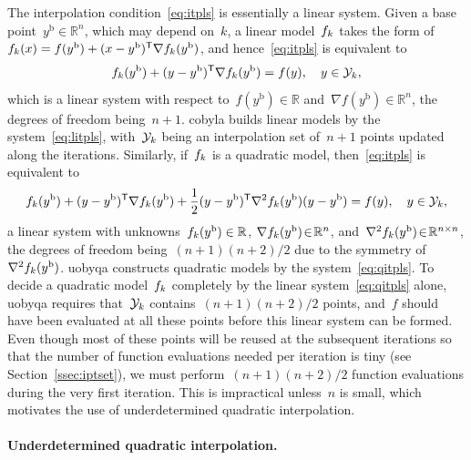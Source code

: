 \documentclass[
    smallextended,  %
    final,        %
]{svjour3}
\newcommand{\R}{\mathbb{R}}
\newcommand{\T}{\mathsf{T}}
\newcommand{\base}{{\text{b}}}
\newcommand{\objm}[1][k]{\obj\ifthenelse{\equal{#1}{}}{}{_{#1}}}
\newcommand{\obj}{f}
\newcommand{\xpt}[1][k]{\mathcal{Y}\ifthenelse{\equal{#1}{}}{}{_{#1}}}
\begin{document}
The interpolation condition~\eqref{eq:itpls} is essentially a linear system.
Given a base point~$y^{\base}\in \R^n$, which may depend on~$k$, a linear model~$\objm$ takes the
form of~$\objm(x) = \obj(y^{\base}) + (x - y^{\base})^{\T} \nabla \objm(y^{\base})$, and
hence~\eqref{eq:itpls} is equivalent to
\begin{equation}
    \label{eq:litpls}
    \objm(y^{\base}) + (y -y^{\base})^{\T} \nabla \objm(y^{\base})  = \obj(y),  \quad y \in \xpt,
\end{equation}
which is a linear system with respect to~$\obj(y^\base) \in \R$ and~$\nabla \obj(y^\base) \in \R^n$, the degrees of freedom being~$n+1$.
\Gls{cobyla} builds linear models by the system~\eqref{eq:litpls}, with~$\xpt$ being an interpolation
set of~$n+1$ points updated along the iterations.
Similarly, if~$\objm$ is a quadratic model, then~\eqref{eq:itpls} is equivalent to
\begin{equation}
    \label{eq:qitpls}
    \objm(y^{\base}) + (y -y^{\base})^{\T} \nabla \objm(y^{\base})
    + \frac{1}{2}(y-y^{\base})^{\T}  \nabla^2 \objm(y^{\base}) (y-y^{\base}) = \obj(y),  \quad y \in \xpt,
\end{equation}
a linear system with unknowns~$\objm(y^\base) \in \R$, $\nabla \objm(y^\base) \!\in\! \R^n$,
and~$\nabla^2 \objm(y^{\base})\!\in\!\R^{n \times n}$, the degrees of freedom being~$(n + 1)(n + 2) / 2$ due to the symmetry of~$\nabla^2 \objm(y^\base)$.
\Gls{uobyqa} constructs quadratic models by the system~\eqref{eq:qitpls}.
To decide a quadratic model~$\objm$ completely by the linear system~\eqref{eq:qitpls} alone,
\gls{uobyqa} requires that~$\xpt$ contains~$(n+1)(n+2)/2$ points, and~$f$ should have been evaluated at all these points before this linear system can be formed.
Even though most of these points will be reused at the subsequent iterations so that the number of
function evaluations needed per iteration is tiny (see Section~\ref{ssec:iptset}), we must perform~$(n + 1)(n + 2) / 2$ function evaluations during the very first iteration.
This is impractical unless~$n$ is small, which motivates the use of underdetermined quadratic interpolation.

\paragraph{\textnormal{\textbf{Underdetermined quadratic interpolation.}}}
\end{document}
